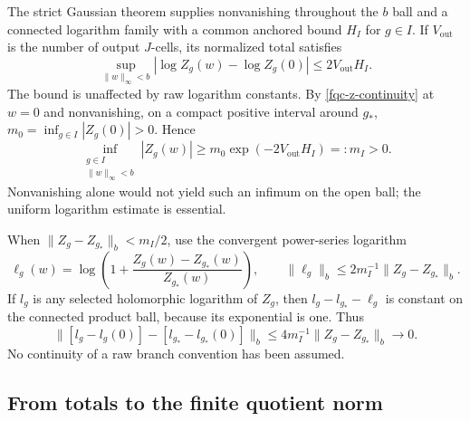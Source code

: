 The strict Gaussian theorem supplies nonvanishing throughout
the $b$ ball and a connected logarithm family with a common
anchored bound $H_I$ for $g\in I$. If $V_{\mathrm{out}}$ is the
number of output $J$-cells, its normalized total satisfies
\begin{equation}
 \sup_{\lVert w\rVert_\infty<b}
  |\log Z_g(w)-\log Z_g(0)|
       \leq 2V_{\mathrm{out}}H_I.
 \label{fqc-log-bound}
\end{equation}
The bound is unaffected by raw logarithm constants.
By \eqref{fqc-z-continuity} at $w=0$ and nonvanishing, on a
compact positive interval around $g_*$,
$m_0=\inf_{g\in I}|Z_g(0)|>0$. Hence
\begin{equation}
 \inf_{\substack{g\in I\\\lVert w\rVert_\infty<b}}
       |Z_g(w)|
 \geq m_0\exp(-2V_{\mathrm{out}}H_I)=:m_I>0.
 \label{fqc-lower-bound}
\end{equation}
Nonvanishing alone would not yield such an infimum on the open
ball; the uniform logarithm estimate is essential.

When $\lVert Z_g-Z_{g_*}\rVert_b<m_I/2$, use the convergent
power-series logarithm
\begin{equation}
 \ell_g(w)=
 \log\left(1+\frac{Z_g(w)-Z_{g_*}(w)}{Z_{g_*}(w)}\right),
 \qquad
 \lVert\ell_g\rVert_b\leq
          2m_I^{-1}\lVert Z_g-Z_{g_*}\rVert_b.
 \label{fqc-log-ratio}
\end{equation}
If $l_g$ is any selected holomorphic logarithm of $Z_g$, then
$l_g-l_{g_*}-\ell_g$ is constant on the connected product ball,
because its exponential is one. Thus
\begin{equation}
 \bigl\lVert[l_g-l_g(0)]-[l_{g_*}-l_{g_*}(0)]\bigr\rVert_b
 \leq 4m_I^{-1}\lVert Z_g-Z_{g_*}\rVert_b
 \longrightarrow0.
 \label{fqc-normalized-log-continuity}
\end{equation}
No continuity of a raw branch convention has been assumed.

\subsection{From totals to the finite quotient norm}
\label{fqc-quotient-section}


